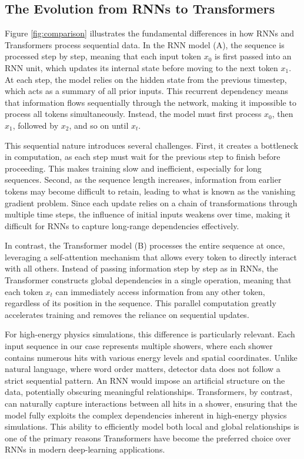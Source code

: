 \subsection{The Evolution from RNNs to Transformers}

Figure \ref{fig:comparison} illustrates the fundamental differences in how RNNs and Transformers process sequential data. In the RNN model (A), the sequence is processed step by step, meaning that each input token $x_0$ is first passed into an RNN unit, which updates its internal state before moving to the next token $x_1$. At each step, the model relies on the hidden state from the previous timestep, which acts as a summary of all prior inputs. This recurrent dependency means that information flows sequentially through the network, making it impossible to process all tokens simultaneously. Instead, the model must first process $x_0$, then $x_1$, followed by $x_2$, and so on until $x_t$.

This sequential nature introduces several challenges. First, it creates a bottleneck in computation, as each step must wait for the previous step to finish before proceeding. This makes training slow and inefficient, especially for long sequences. Second, as the sequence length increases, information from earlier tokens may become difficult to retain, leading to what is known as the vanishing gradient problem. Since each update relies on a chain of transformations through multiple time steps, the influence of initial inputs weakens over time, making it difficult for RNNs to capture long-range dependencies effectively.

In contrast, the Transformer model (B) processes the entire sequence at once, leveraging a self-attention mechanism that allows every token to directly interact with all others. Instead of passing information step by step as in RNNs, the Transformer constructs global dependencies in a single operation, meaning that each token $x_t$ can immediately access information from any other token, regardless of its position in the sequence. This parallel computation greatly accelerates training and removes the reliance on sequential updates.

For high-energy physics simulations, this difference is particularly relevant. Each input sequence in our case represents multiple showers, where each shower contains numerous hits with various energy levels and spatial coordinates. Unlike natural language, where word order matters, detector data does not follow a strict sequential pattern. An RNN would impose an artificial structure on the data, potentially obscuring meaningful relationships. Transformers, by contrast, can naturally capture interactions between all hits in a shower, ensuring that the model fully exploits the complex dependencies inherent in high-energy physics simulations. This ability to efficiently model both local and global relationships is one of the primary reasons Transformers have become the preferred choice over RNNs in modern deep-learning applications.

